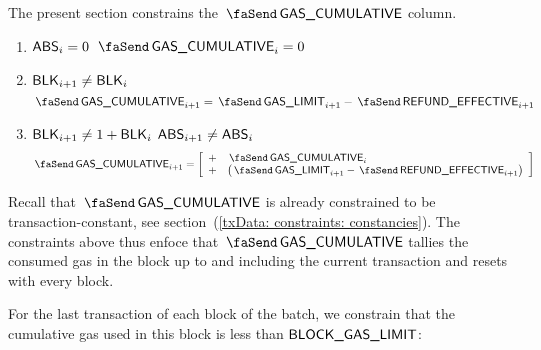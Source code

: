 The present section constrains the $\txCumulativeConsumedGas$ column. 
\begin{enumerate}
	\item \If $\textsf{ABS}_{i} = 0$ \Then $\txCumulativeConsumedGas_{i} = 0$
	\item \If $\textsf{BLK}_{i + 1} \neq \textsf{BLK}_{i}$ \Then
		\[ \txCumulativeConsumedGas_{i + 1} = \txGasLimit_{i + 1} - \txEffectiveRefund_{i + 1} \]
	\item \If $\textsf{BLK}_{i + 1} \neq 1 + \textsf{BLK}_{i}$ \et $\textsf{ABS}_{i + 1} \neq \textsf{ABS}_{i}$ \Then
		\[
			\txCumulativeConsumedGas_{i + 1} 
			=
			\left[ \begin{array}{ll}
				+ & \txCumulativeConsumedGas_{i}                           \\
				+ & \big(\txGasLimit_{i + 1} - \txEffectiveRefund_{i + 1}\big) \\
			\end{array}\right]
		\]
\end{enumerate}
Recall that $\txCumulativeConsumedGas$ is already constrained to be transaction-constant, see section~(\ref{txData: constraints: constancies}).
The constraints above thus enfoce that $\txCumulativeConsumedGas$ tallies the consumed gas in the block up to and including the current transaction and resets with every block.

For the last transaction of each block of the batch, we constrain that the cumulative gas used in this block is less than $\textsf{BLOCK\_GAS\_LIMIT}$:

